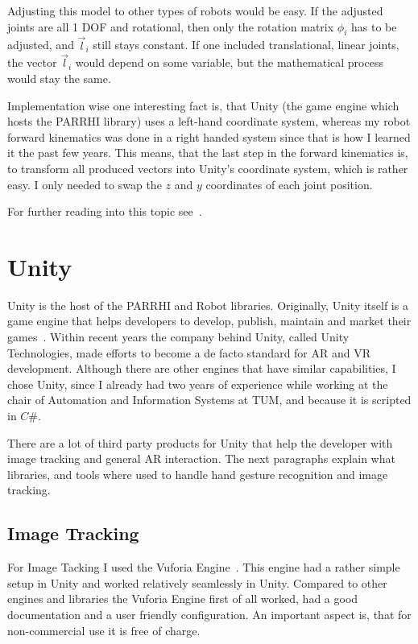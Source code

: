 Adjusting this model to other types of robots would be easy. If the adjusted joints are all 1 DOF and rotational, then only the rotation matrix $\phi_i$ has to be adjusted, and $\vec{l}_i$ still stays constant. If one included translational, linear joints, the vector $\vec{l}_i$ would depend on some variable, but the mathematical process would stay the same.

Implementation wise one interesting fact is, that Unity (the game engine which hosts the PARRHI library) uses a left-hand coordinate system, whereas my robot forward kinematics was done in a right handed system since that is how I learned it the past few years. This means, that the last step in the forward kinematics is, to transform all produced vectors into Unity's coordinate system, which is rather easy. I only needed to swap the $z$ and $y$ coordinates of each joint position.

For further reading into this topic see~\cite{murray2017mathematical}.
	
\section{Unity}
Unity is the host of the PARRHI and Robot libraries. Originally, Unity itself is a game engine that helps developers to develop, publish, maintain and market their games~\cite{Unity}. Within recent years the company behind Unity, called Unity Technologies, made efforts to become a de facto standard for AR and VR development. Although there are other engines that have similar capabilities, I chose Unity, since I already had two years of experience while working at the chair of Automation and Information Systems at TUM, and because it is scripted in $C\#$. 

There are a lot of third party products for Unity that help the developer with image tracking and general AR interaction. The next paragraphs explain what libraries, and tools where used to handle hand gesture recognition and image tracking.



\subsection{Image Tracking}
For Image Tacking I used the Vuforia Engine~\cite{Vuforia}. This engine had a rather simple setup in Unity and worked relatively seamlessly in Unity. Compared to other engines and libraries the Vuforia Engine first of all worked, had a good documentation and a user friendly configuration. An important aspect is, that for non-commercial use it is free of charge. 

